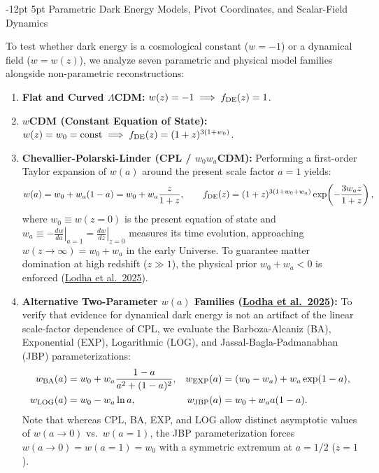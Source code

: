 \documentclass[11pt,letterpaper]{article}
\makeatletter
\renewcommand{\subsection}{\@startsection{subsection}{2}{\z@}%
  {-12pt \@plus -3pt \@minus -1pt}%
  {5pt \@plus 1pt}%
  {\normalfont\large\bfseries\color{tealaccent}}}
\makeatother
\begin{document}
\subsection{Parametric Dark Energy Models, Pivot Coordinates, and Scalar-Field Dynamics}

To test whether dark energy is a cosmological constant ($w = -1$) or a dynamical field ($w = w(z)$), we analyze seven parametric and physical model families alongside non-parametric reconstructions:
\begin{enumerate}
    \setlength{\itemsep}{3pt}
    \item \textbf{Flat and Curved $\Lambda$CDM:} $w(z) = -1 \implies f_{\rm DE}(z) = 1$.
    \item \textbf{$w$CDM (Constant Equation of State):} $w(z) = w_0 = \text{const} \implies f_{\rm DE}(z) = (1+z)^{3(1+w_0)}$.
    \item \textbf{Chevallier-Polarski-Linder (CPL / $w_0 w_a$CDM):} Performing a first-order Taylor expansion of $w(a)$ around the present scale factor $a=1$ yields:
    \begin{equation}
        w(a) = w_0 + w_a (1 - a) = w_0 + w_a \frac{z}{1 + z}, \qquad f_{\rm DE}(z) = (1 + z)^{3(1 + w_0 + w_a)} \exp\!\left( -\frac{3 w_a z}{1 + z} \right),
        \label{eq:cpl}
    \end{equation}
    where $w_0 \equiv w(z=0)$ is the present equation of state and $w_a \equiv -\left.\frac{dw}{da}\right|_{a=1} = \left.\frac{dw}{dz}\right|_{z=0}$ measures its time evolution, approaching $w(z \to \infty) = w_0 + w_a$ in the early Universe. To guarantee matter domination at high redshift ($z \gg 1$), the physical prior $w_0 + w_a < 0$ is enforced (\href{https://arxiv.org/abs/2503.14743}{Lodha et al.\ 2025}).
    \item \textbf{Alternative Two-Parameter $w(a)$ Families (\href{https://arxiv.org/abs/2503.14743}{Lodha et al.\ 2025}):} To verify that evidence for dynamical dark energy is not an artifact of the linear scale-factor dependence of CPL, we evaluate the Barboza-Alcaniz (BA), Exponential (EXP), Logarithmic (LOG), and Jassal-Bagla-Padmanabhan (JBP) parameterizations:
    \begin{align}
        w_{\rm BA}(a) &= w_0 + w_a \frac{1 - a}{a^2 + (1 - a)^2}, & w_{\rm EXP}(a) &= (w_0 - w_a) + w_a \exp(1 - a), \nonumber \\
        w_{\rm LOG}(a) &= w_0 - w_a \ln a, & w_{\rm JBP}(a) &= w_0 + w_a a(1 - a).
        \label{eq:alt_w}
    \end{align}
    Note that whereas CPL, BA, EXP, and LOG allow distinct asymptotic values of $w(a \to 0)$ vs.\ $w(a=1)$, the JBP parameterization forces $w(a \to 0) = w(a=1) = w_0$ with a symmetric extremum at $a = 1/2$ ($z = 1$).

\end{enumerate}
\end{document}
